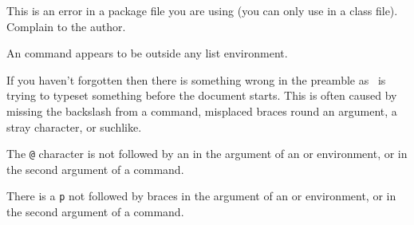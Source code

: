 \begin{plainlist}
\item[]

    This is an error in a package file you are using 
(you can only use \cmd{\LoadClass} in a class file). Complain to the author.

\item[]

    An \cmd{\item} command appears to be outside any list environment.






\item[]  

    If you haven't forgotten  then there is something
wrong in the preamble as \ltx\ is trying to typeset something before
the document starts. This is often caused by missing the backslash from
a command, misplaced braces round an argument, a stray character, or
suchlike.

\item[]

    The \texttt{@} character is not followed by an \pixatexp{}
in the argument of an  or
 environment, or in the second argument of a
\cmd{\multicolumn} command.

\item[]

    There is a \texttt{p} not followed by braces 
in the argument of an  or
 environment, or in the second argument of a
\cmd{\multicolumn} command.


\item[]


\end{plainlist}
